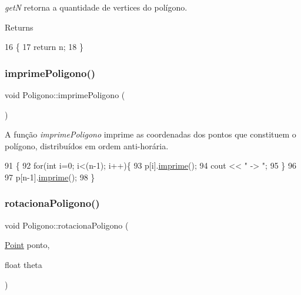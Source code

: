{\itshape getN} retorna a quantidade de vertices do polígono. 

\begin{DoxyReturn}{Returns}

\end{DoxyReturn}

\begin{DoxyCode}
16                   \{
17     \textcolor{keywordflow}{return} n;
18 \}
\end{DoxyCode}
\mbox{\label{class_poligono_a87d58f9d4827793eaa811491cce097b0}} 
\subsubsection{\texorpdfstring{imprime\+Poligono()}{imprimePoligono()}}
{\footnotesize\ttfamily void Poligono\+::imprime\+Poligono (\begin{DoxyParamCaption}{ }\end{DoxyParamCaption})}



A função {\itshape imprime\+Poligono} imprime as coordenadas dos pontos que constituem o polígono, distribuídos em ordem anti-\/horária. 


\begin{DoxyCode}
91                               \{
92     \textcolor{keywordflow}{for}(\textcolor{keywordtype}{int} i=0; i<(n-1); i++)\{
93         p[i].\hyperlink{class_point_a1fb5c2501c27ab2cbc99d06c2a26a741}{imprime}();
94         cout << \textcolor{stringliteral}{" -> "};
95     \}
96 
97     p[n-1].\hyperlink{class_point_a1fb5c2501c27ab2cbc99d06c2a26a741}{imprime}();
98 \}
\end{DoxyCode}
\mbox{\label{class_poligono_ad4106abbe48a1c2824da456a4bf4cd71}} 
\subsubsection{\texorpdfstring{rotaciona\+Poligono()}{rotacionaPoligono()}}
{\footnotesize\ttfamily void Poligono\+::rotaciona\+Poligono (\begin{DoxyParamCaption}\item[{\hyperlink{class_point}{Point}}]{ponto,  }\item[{float}]{theta }\end{DoxyParamCaption})}



